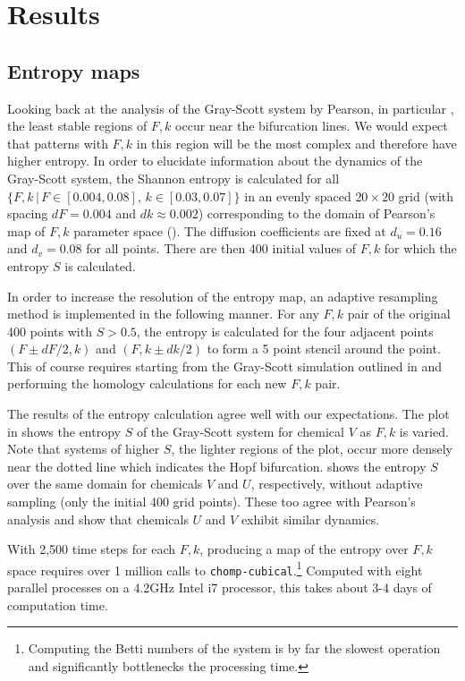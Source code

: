 \chapter{Results} \label{ch:results}

\section{Entropy maps}

Looking back at the analysis of the Gray-Scott system by Pearson, in particular , the least stable regions of $F, k$ occur near the bifurcation lines. We would expect that patterns with $F, k$ in this region will be the most complex and therefore have higher entropy. In order to elucidate information about the dynamics of the Gray-Scott system, the Shannon entropy  is calculated for all $\{ F, k \, | \, F \in [0.004, 0.08], \, k \in [0.03, 0.07] \}$ in an evenly spaced $20 \times 20$ grid (with spacing $dF = 0.004$ and $dk \approx 0.002$) corresponding to the domain of Pearson's map of $F, k$ parameter space (). The diffusion coefficients are fixed at $d_u = 0.16$ and $d_v = 0.08$ for all points. There are then 400 initial values of $F,k$ for which the entropy $S$ is calculated.

In order to increase the resolution of the entropy map, an adaptive resampling method is implemented in the following manner. For any $F, k$ pair of the original 400 points with $S > 0.5$, the entropy is calculated for the four adjacent points $(F \pm dF/2, k)$ and $(F, k \pm dk/2)$ to form a 5 point stencil around the point. This of course requires starting from the Gray-Scott simulation outlined in  and performing the homology calculations for each new $F,k$ pair.

The results of the entropy calculation agree well with our expectations. The plot in  shows the entropy $S$ of the Gray-Scott system for chemical $V$ as $F, k$ is varied. Note that systems of higher $S$, the lighter regions of the plot, occur more densely near the dotted line which indicates the Hopf bifurcation.  shows the entropy $S$ over the same domain for chemicals $V$ and $U$, respectively, without adaptive sampling (only the initial 400 grid points). These too agree with Pearson's analysis and show that chemicals $U$ and $V$ exhibit similar dynamics.

With 2,500 time steps for each $F,k$, producing a map of the entropy over $F,k$ space requires over 1 million calls to \texttt{chomp-cubical}.\footnote{Computing the Betti numbers of the system is by far the slowest operation and significantly bottlenecks the processing time.} Computed with eight parallel processes on a 4.2GHz Intel i7 processor, this takes about 3-4 days of computation time.

